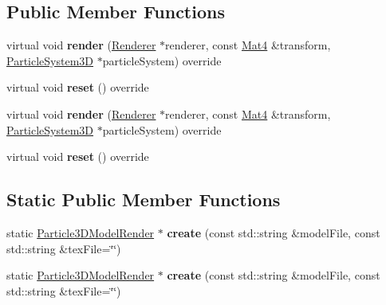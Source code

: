 \subsection*{Public Member Functions}
\begin{DoxyCompactItemize}
\item 
\mbox{\label{classParticle3DModelRender_a04e7d12955a8de4d5219bed976798216}} 
virtual void {\bfseries render} (\hyperlink{classRenderer}{Renderer} $\ast$renderer, const \hyperlink{classMat4}{Mat4} \&transform, \hyperlink{classParticleSystem3D}{Particle\+System3D} $\ast$particle\+System) override
\item 
\mbox{\label{classParticle3DModelRender_a1f418622476b2489af2fc5ca3024ae70}} 
virtual void {\bfseries reset} () override
\item 
\mbox{\label{classParticle3DModelRender_ad697006ae88f6f27cdaf4bb7db3bf3dd}} 
virtual void {\bfseries render} (\hyperlink{classRenderer}{Renderer} $\ast$renderer, const \hyperlink{classMat4}{Mat4} \&transform, \hyperlink{classParticleSystem3D}{Particle\+System3D} $\ast$particle\+System) override
\item 
\mbox{\label{classParticle3DModelRender_a4bbb4f4eafa6ba5a541036d37abc3220}} 
virtual void {\bfseries reset} () override
\end{DoxyCompactItemize}
\subsection*{Static Public Member Functions}
\begin{DoxyCompactItemize}
\item 
\mbox{\label{classParticle3DModelRender_a6a363f1388c50ee0ed40900989235092}} 
static \hyperlink{classParticle3DModelRender}{Particle3\+D\+Model\+Render} $\ast$ {\bfseries create} (const std\+::string \&model\+File, const std\+::string \&tex\+File=\char`\"{}\char`\"{})
\item 
\mbox{\label{classParticle3DModelRender_a01f9f7a07a6a04f88654b8ceb4350f6b}} 
static \hyperlink{classParticle3DModelRender}{Particle3\+D\+Model\+Render} $\ast$ {\bfseries create} (const std\+::string \&model\+File, const std\+::string \&tex\+File=\char`\"{}\char`\"{})
\end{DoxyCompactItemize}
